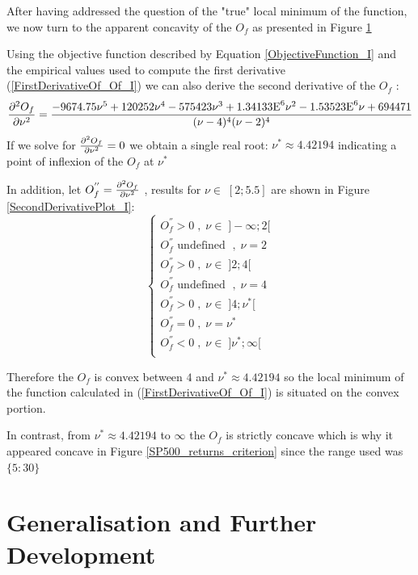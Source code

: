 After having addressed the question of the "true" local minimum of the function, we now turn to the apparent concavity of the $O_f$ as presented in Figure \ref{} \bigskip\par
Using the objective function described by Equation \ref{ObjectiveFunction_I} and the empirical values used to compute the first derivative (\ref{FirstDerivativeOf_Of_I}) we can also derive the second derivative of the $O_f$ :
\begin{equation}\label{SecondDerivativeOf_Of_I}
    \pdv[2]{O_f}{\nu} =  \frac{-9674.75 \nu^5 + 120252 \nu^4 - 575423 \nu^3 + 1.34133\text{E}^6 \nu^2 - 1.53523\text{E}^6 \nu + 694471}{(\nu - 4)^4 (\nu - 2)^4}
\end{equation}
If we solve for $\pdv[2]{O_f}{\nu} = 0$ we obtain a single real root: $\nu^* \approx 4.42194$ indicating a point of inflexion of the $O_f$ at $\nu^*$ 
\smallskip \par
In addition, let $O_f^{''}=\pdv[2]{O_f}{\nu}$ , results for $\nu \in \; [2;5.5]$ are shown in Figure \ref{SecondDerivativePlot_I}:
\begin{equation*}
    \begin{cases}
        O_f^{''} > 0 \; , \; \nu \in \; ]-\infty;2[ \\
        O_f^{''} \text{ undefined } \; , \; \nu = 2 \\
        O_f^{''} > 0 \; , \; \nu \in \; ]2;4[ \\
        O_f^{''} \text{ undefined } \; , \; \nu = 4 \\
        O_f^{''} > 0 \; , \; \nu \in \; ]4;\nu^*[ \\
        O_f^{''} = 0 \; , \; \nu = \nu^* \\
        O_f^{''} < 0 \; , \; \nu \in \; ]\nu^*;\infty[ \\
    \end{cases}
\end{equation*}

Therefore the $O_f$ is convex between $4$ and $\nu^* \approx 4.42194$ so the local minimum of the function calculated in (\ref{FirstDerivativeOf_Of_I}) is situated on the convex portion.
\smallskip\par
In contrast, from $\nu^* \approx 4.42194$ to $\infty$ the $O_f$ is strictly concave which is why it appeared concave in Figure \ref{SP500_returns_criterion} since the range used was $\{5:30\}$

\section{Generalisation and Further Development}


